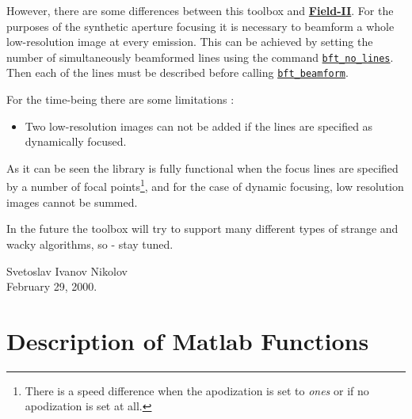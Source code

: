 \documentclass{manual}
\begin{document}
However, there are some differences between this toolbox and {\bf \href{http://www.it.dtu.dk/~jaj/field}{Field-II}}. 
For the purposes of the synthetic aperture focusing it is necessary to 
beamform a whole low-resolution image at every emission. This can be 
achieved by setting the number of simultaneously beamformed lines using the 
command \hyperlink{bft_no_lines}{\tt bft\_no\_lines}. Then each of the lines
must be described before calling \hyperlink{bft_beamform}{\tt bft\_beamform}.

For the time-being there are some limitations :
\begin{itemize}
\item Two low-resolution images can not be added if the lines are specified 
       as dynamically focused.        
\end{itemize}

 As it can be seen the library is fully functional when the focus lines 
are specified by a number of focal points\footnote{There is a speed difference 
when the apodization is set to \emph{ones} or if no apodization is set at all.},
and for the case of dynamic focusing, low resolution images cannot be summed.
 
In the future the toolbox will try to support many different types of strange and wacky 
algorithms, so - stay tuned. 


\vspace{1cm}
Svetoslav Ivanov Nikolov \\
February 29, 2000.


\chapter{Description of Matlab Functions}
\label{chap_func_desc}
\end{document}
